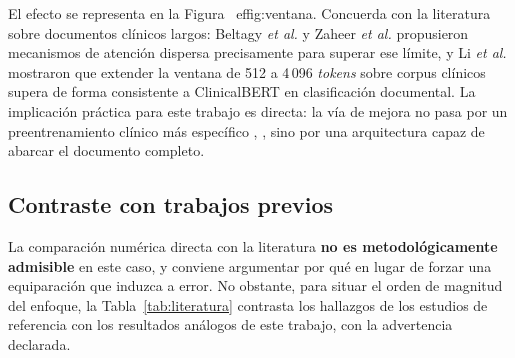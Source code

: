 \documentclass[conference]{IEEEtran}
\begin{document}
El efecto se representa en la Figura~
ef{fig:ventana}. Concuerda con la
literatura sobre documentos clínicos largos:
Beltagy \emph{et al.} \cite{longformer} y Zaheer \emph{et al.}
\cite{bigbird} propusieron mecanismos de atención dispersa precisamente para
superar ese límite, y Li \emph{et al.} \cite{cliniclong} mostraron que
extender la ventana de 512 a 4\,096 \emph{tokens} sobre corpus clínicos
supera de forma consistente a ClinicalBERT en clasificación documental. La
implicación práctica para este trabajo es directa: la vía de mejora no pasa por
un preentrenamiento clínico más específico \cite{pubmedbert}, \cite{huang},
sino por una arquitectura capaz de abarcar el documento completo.



\subsection{Contraste con trabajos previos}
La comparación numérica directa con la literatura \textbf{no es
metodológicamente admisible} en este caso, y conviene argumentar por qué en
lugar de forzar una equiparación que induzca a error. No obstante, para
situar el orden de magnitud del enfoque, la Tabla~\ref{tab:literatura}
contrasta los hallazgos de los estudios de referencia con los resultados
análogos de este trabajo, con la advertencia declarada.
\end{document}
